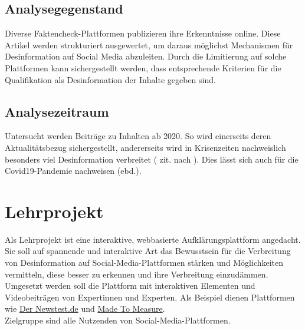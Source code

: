 \documentclass[12pt,a4paper]{article}        %
\begin{document}
\subsection{Analysegegenstand}
Diverse Faktencheck-Plattformen publizieren ihre Erkenntnisse online. Diese Artikel werden strukturiert ausgewertet, um daraus möglichst Mechanismen für Desinformation auf Social Media abzuleiten. Durch die Limitierung auf solche Plattformen kann sichergestellt werden, dass entsprechende Kriterien für die Qualifikation als Desinformation der Inhalte gegeben sind.
\subsection{Analysezeitraum}
Untersucht werden Beiträge zu Inhalten ab 2020. So wird einerseits deren Aktualitätsbezug sichergestellt, andererseits wird in Krisenzeiten nachweislich besonders viel Desinformation verbreitet (\textcite{tandoc_defining_2018} zit. nach \textcite[2]{ceron_fake_2021}). Dies lässt sich auch für die Covid19-Pandemie nachweisen (ebd.).

\section{Lehrprojekt}
Als Lehrprojekt ist eine interaktive, webbasierte Aufklärungsplattform angedacht. Sie soll auf spannende und interaktive Art das Bewusstsein für die Verbreitung von Desinformation auf Social-Media-Plattformen stärken und Möglichkeiten vermitteln, diese besser zu erkennen und ihre Verbreitung einzudämmen.\\
Umgesetzt werden soll die Plattform mit interaktiven Elementen und Videobeiträgen von Expertinnen und Experten. Als Beispiel dienen Plattformen wie \href{https://www.der-newstest.de}{Der Newstest.de} und \href{https://madetomeasure.online/de/}{Made To Measure}.\\
Zielgruppe sind alle Nutzenden von Social-Media-Plattformen.

\pagebreak

\printbibliography[heading=bibintoc, title={Literaturverzeichnis}] %
\end{document}

